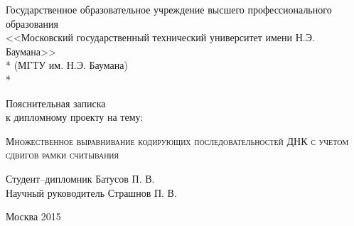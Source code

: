\begin{titlepage}
\newpage

\begin{center}
Государственное образовательное учреждение высшего профессионального образования \\
\vspace{1cm}
\Large<<Московский государственный технический университет имени Н.Э. Баумана>> \\*
(МГТУ им. Н.Э. Баумана) \\*
\hrulefill
\end{center}


\vspace{1em}

\begin{center}
\Large Пояснительная записка \\ к дипломному проекту на тему:
\end{center}

\vspace{2.0em}

\begin{center}
	\Large
\textsc{Множественное выравнивание кодирующих последовательностей ДНК с учетом сдвигов рамки считывания}
\end{center}

\vspace{6em}

\begin{flushleft}
Студент--дипломник \hrulefill Батусов П. В. \\
\vspace{1.5em}
Научный руководитель \hrulefill Страшнов П. В.\\
\vspace{1.5em}
\end{flushleft}

\vspace{\fill}

\begin{center}
Москва 2015
\end{center}

\end{titlepage}
